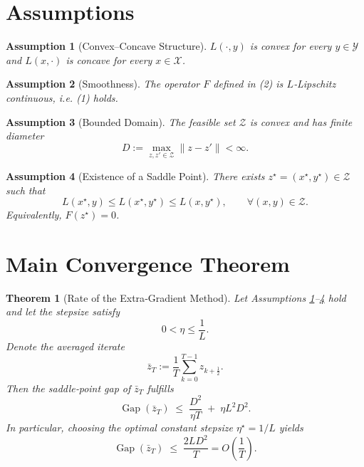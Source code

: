 \documentclass{article}
\newtheorem{theorem}{Theorem}
\newtheorem{assumption}{Assumption}
\newcommand{\gap}{\operatorname{Gap}}
\begin{document}
\section*{Assumptions}
\begin{assumption}[Convex–Concave Structure]\label{as:cc}
$L(\cdot,y)$ is convex for every $y\in\mathcal Y$ and $L(x,\cdot)$ is concave for every $x\in\mathcal X$.
\end{assumption}
\begin{assumption}[Smoothness]\label{as:smooth}
The operator $F$ defined in (2) is $L$‑Lipschitz continuous, i.e. (1) holds.
\end{assumption}
\begin{assumption}[Bounded Domain]\label{as:bounded}
The feasible set $\mathcal Z$ is convex and has finite diameter
\[
D:=\max_{z,z'\in\mathcal Z}\|z-z'\|<\infty .
\]
\end{assumption}
\begin{assumption}[Existence of a Saddle Point]\label{as:saddle}
There exists $z^{\star}=(x^{\star},y^{\star})\in\mathcal Z$ such that
\[
L(x^{\star},y)\le L(x^{\star},y^{\star})\le L(x,y^{\star}),\qquad\forall (x,y)\in\mathcal Z .
\]
Equivalently, $F(z^{\star})=0$.
\end{assumption}

\section*{Main Convergence Theorem}
\begin{theorem}[Rate of the Extra‑Gradient Method]\label{thm:eg-rate}
Let Assumptions \ref{as:cc}–\ref{as:saddle} hold and let the stepsize satisfy
\[
0<\eta\le\frac{1}{L}.
\]
Denote the averaged iterate
\[
\bar z_{T}:=\frac{1}{T}\sum_{k=0}^{T-1}z_{k+\frac12}.
\]
Then the saddle‑point gap of $\bar z_{T}$ fulfills
\[
\gap(\bar z_{T})\;\le\;
\frac{D^{2}}{\eta T}\;+\;\eta L^{2}D^{2}. \tag{4}
\]
In particular, choosing the optimal constant stepsize $\eta^{\star}=1/L$ yields
\[
\gap(\bar z_{T})\;\le\;\frac{2LD^{2}}{T}=O\!\left(\frac{1}{T}\right).
\]
\end{theorem}

\end{document}
